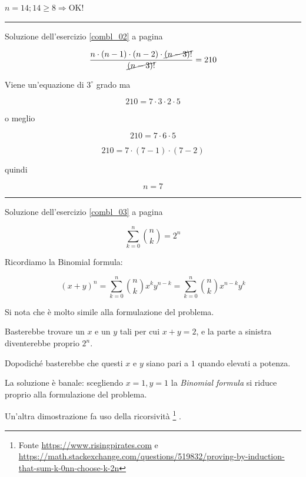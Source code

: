 $n=14; 14\ge 8 \Rightarrow $OK!

\vspace{1cm}
\hrule
\vspace{1cm}



Soluzione dell'esercizio \ref{combl_02} a pagina \pageref{combl_02}\label{combs_02}

\[
\frac{n\cdot(n-1)\cdot(n-2)\cdot
\cancel{(n-3)!}
}{
\cancel{(n-3)!}
} = 210
\]

Viene un'equazione di $3^\circ$ grado ma

\[
210=7\cdot3\cdot2\cdot5
\]

o meglio

\[
210=7\cdot6\cdot5
\]

\[
210=7\cdot(7-1)\cdot(7-2)
\]

quindi 

\[
n=7
\]

\vspace{1cm}
\hrule
\vspace{1cm}



Soluzione dell'esercizio \ref{combl_03} a pagina \pageref{combl_03}\label{combs_03}

\[
\sum_{k=0}^{n}{\binom{n}{k}}=2^n
\]

Ricordiamo la Binomial formula:

\begin{equation}
(x+y)^n=\sum_{k=0}^{n}{\binom{n}{k}x^{k}y^{n-k}}
=\sum_{k=0}^{n}{\binom{n}{k}x^{n-k}y^{k}}
\end{equation}

Si nota che è molto simile alla formulazione del problema.

Basterebbe trovare un $x$ e un $y$ tali per cui $x+y=2$, e la parte a sinistra diventerebbe proprio $2^n$.

Dopodiché basterebbe che questi $x$ e $y$ siano pari a $1$ quando elevati a potenza.

La soluzione è banale: scegliendo $x=1, y=1$ la \emph{Binomial formula} si riduce proprio alla formulazione del problema.

\vspace{1cm}

Un'altra dimostrazione fa uso della ricorsività
\footnote{Fonte 
\href{https://www.risingpirates.com}{https://www.risingpirates.com}
e
\href{https://math.stackexchange.com/questions/519832/proving-by-induction-that-sum-k-0nn-choose-k-2n}
{https://math.stackexchange.com/questions/519832/proving-by-induction-that-sum-k-0nn-choose-k-2n}
}
.


